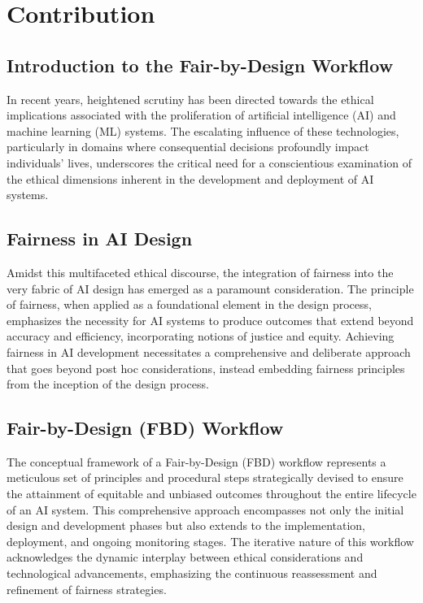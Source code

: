 \chapter{Contribution} %
\label{chap:contribution}

\section{Introduction to the Fair-by-Design Workflow}
\label{section:workflow-introduction}

In recent years, heightened scrutiny has been directed towards the ethical implications associated with the proliferation of artificial intelligence (AI) and machine learning (ML) systems. The escalating influence of these technologies, particularly in domains where consequential decisions profoundly impact individuals' lives, underscores the critical need for a conscientious examination of the ethical dimensions inherent in the development and deployment of AI systems.

\section{Fairness in AI Design}

Amidst this multifaceted ethical discourse, the integration of fairness into the very fabric of AI design has emerged as a paramount consideration. The principle of fairness, when applied as a foundational element in the design process, emphasizes the necessity for AI systems to produce outcomes that extend beyond accuracy and efficiency, incorporating notions of justice and equity. Achieving fairness in AI development necessitates a comprehensive and deliberate approach that goes beyond post hoc considerations, instead embedding fairness principles from the inception of the design process.

\section{Fair-by-Design (FBD) Workflow}

The conceptual framework of a Fair-by-Design (FBD) workflow represents a meticulous set of principles and procedural steps strategically devised to ensure the attainment of equitable and unbiased outcomes throughout the entire lifecycle of an AI system. This comprehensive approach encompasses not only the initial design and development phases but also extends to the implementation, deployment, and ongoing monitoring stages. The iterative nature of this workflow acknowledges the dynamic interplay between ethical considerations and technological advancements, emphasizing the continuous reassessment and refinement of fairness strategies.


